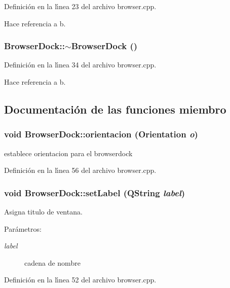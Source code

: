 Definici\'{o}n en la l\'{\i}nea 23 del archivo browser.cpp.

Hace referencia a b.
\subsubsection{\setlength{\rightskip}{0pt plus 5cm}Browser\-Dock::$\sim$Browser\-Dock ()}\label{classBrowserDock_a2}




Definici\'{o}n en la l\'{\i}nea 34 del archivo browser.cpp.

Hace referencia a b.

\subsection{Documentaci\'{o}n de las funciones miembro}
\subsubsection{\setlength{\rightskip}{0pt plus 5cm}void Browser\-Dock::orientacion (Orientation {\em o})}\label{classBrowserDock_a5}


establece orientacion para el browserdock 



Definici\'{o}n en la l\'{\i}nea 56 del archivo browser.cpp.
\subsubsection{\setlength{\rightskip}{0pt plus 5cm}void Browser\-Dock::set\-Label (QString {\em label})}\label{classBrowserDock_a4}


Asigna titulo de ventana. 

\begin{Desc}
\item[Par\'{a}metros:]
\begin{description}
\item[{\em label}]cadena de nombre \end{description}
\end{Desc}


Definici\'{o}n en la l\'{\i}nea 52 del archivo browser.cpp.

